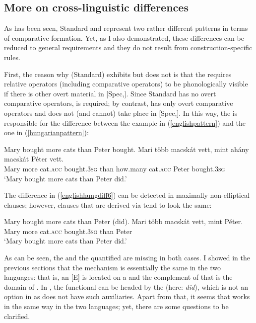 \subsection{More on cross-linguistic differences} \label{sec:6moreon}
As has been seen, Standard  and  represent two rather different patterns in terms of comparative  formation. Yet, as I also demonstrated, these differences can be reduced to general requirements and they do not result from construction-specific rules.

First, the reason why (Standard)  exhibits  but  does not is that the  requires relative operators (including comparative operators) to be phonologically visible if there is other overt material in [Spec,]. Since Standard  has no overt comparative operators,  is required; by contrast,  has only overt comparative operators and  does not (and cannot) take place in [Spec,]. In this way, the  is responsible for the difference between the  example in (\ref{englishpattern}) and the  one in (\ref{hungarianpattern}):

\ea \label{englishhungdiff6}
\ea	Mary bought more cats than Peter bought. \label{englishpattern}
\ex \gll Mari	több	macskát	vett,	mint ahány macskát	Péter	vett. \label{hungarianpattern}\\
Mary more	cat.\textsc{acc} bought.\textsc{3sg}	than	how.many cat.\textsc{acc} Peter bought.\textsc{3sg}\\
\glt `Mary bought more cats than Peter did.'
\z
\z

The difference in (\ref{englishhungdiff6}) can be detected in maximally non-elliptical clauses; however, clauses that are derived via  tend to look the same:

\ea
\ea Mary bought more cats than Peter (did).
\ex	\gll Mari	több	macskát	vett,	mint	Péter. \label{hungarianelliptical}\\
Mary more	cat.\textsc{acc} bought.\textsc{3sg} than	Peter\\
\glt `Mary bought more cats than Peter did.'
\z
\z
		
As can be seen, the  and the quantified  are missing in both cases. I showed in the previous sections that the  mechanism is essentially the same in the two languages: that is, an [E]  is located on a  and the complement of that  is the domain of . In , the functional  can be headed by the  (here: \textit{did}), which is not an option in  as  does not have such auxiliaries. Apart from that, it seems that  works in the same way in the two languages; yet, there are some questions to be clarified.


